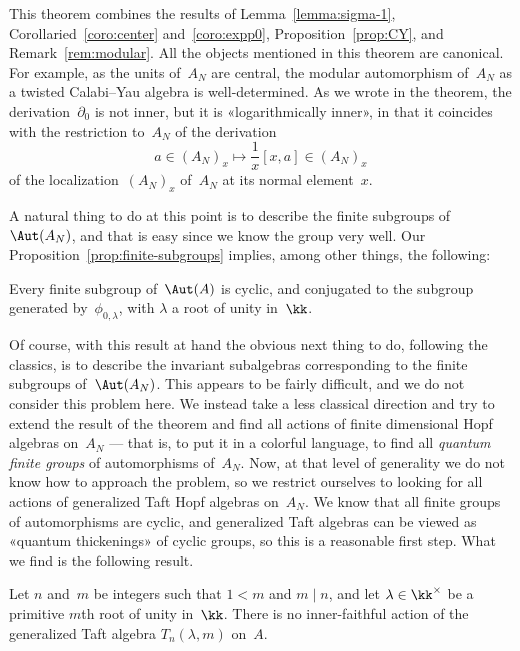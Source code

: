This theorem combines the results of Lemma~\ref{lemma:sigma-1},
Corollaried~\ref{coro:center} and~\ref{coro:expp0},
Proposition~\ref{prop:CY}, and Remark~\ref{rem:modular}. All the objects
mentioned in this theorem are canonical. For example, as the units of~$A_N$
are central, the modular automorphism of~$A_N$ as a twisted Calabi--Yau
algebra is well-determined. As we wrote in the theorem,
the derivation~$\partial_0$ is not inner, but it is «logarithmically
inner», in that it coincides with the restriction to~$A_N$ of the
derivation
  \[
  a\in (A_N)_x \mapsto \frac{1}{x}[x,a] \in (A_N)_x
  \]
of the localization~$(A_N)_x$ of~$A_N$ at its normal element~$x$.

\bigskip

A natural thing to do at this point is to describe 
the finite subgroups of $\Aut(A_N)$, and that is easy since we know the
group very well. Our Proposition~\ref{prop:finite-subgroups} implies, among
other things, the following:

\begin{Theorem}
Every finite subgroup of~$\Aut(A)$ is cyclic, and conjugated to the
subgroup generated by~$\phi_{0,\lambda}$, with $\lambda$ a root of unity
in~$\kk$. 
\end{Theorem}


Of course, with this result at hand the obvious next thing to do, following
the classics, is to describe the invariant subalgebras corresponding to the
finite subgroups of~$\Aut(A_N)$. This appears to be fairly difficult, and
we do not consider this problem here. We instead take a less classical
direction and try to extend the result of the theorem and find all actions
of finite dimensional Hopf algebras on~$A_N$ --- that is, to put it in a
colorful language, to find all \emph{quantum finite groups} of
automorphisms of~$A_N$. Now, at that level of generality we do not know how
to approach the problem, so we restrict ourselves to looking for all
actions of generalized Taft Hopf algebras on~$A_N$. We know that all finite
groups of automorphisms are cyclic, and generalized Taft algebras can be
viewed as «quantum thickenings» of cyclic groups, so this is a reasonable
first step. What we find is the following result.

\begin{Theorem}\label{thm:taft}
Let $n$ and~$m$ be integers such that $1<m$ and $m\mid n$, and let
$\lambda\in\kk^\times$ be a primitive $m$th root of unity in~$\kk$. There
is no inner-faithful action of the generalized Taft algebra
$T_n(\lambda,m)$ on~$A$.
\end{Theorem}

